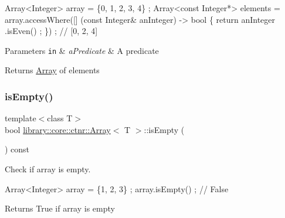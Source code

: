 \begin{DoxyCode}
Array<Integer> array = \{0, 1, 2, 3, 4\} ;
Array<const Integer*> elements = array.accessWhere([] (\textcolor{keyword}{const} Integer& anInteger) -> \textcolor{keywordtype}{bool} \{ \textcolor{keywordflow}{return} anInteger
      .isEven() ; \}) ; \textcolor{comment}{// [0, 2, 4]}
\end{DoxyCode}



\begin{DoxyParams}[1]{Parameters}
\mbox{\tt in}  & {\em a\+Predicate} & A predicate \\
\hline
\end{DoxyParams}
\begin{DoxyReturn}{Returns}
\hyperlink{classlibrary_1_1core_1_1ctnr_1_1_array}{Array} of elements 
\end{DoxyReturn}
\mbox{\label{classlibrary_1_1core_1_1ctnr_1_1_array_a77d943be46a6d0313be3f2c5ca66d231}} 
\subsubsection{\texorpdfstring{is\+Empty()}{isEmpty()}}
{\footnotesize\ttfamily template$<$class T$>$ \\
bool \hyperlink{classlibrary_1_1core_1_1ctnr_1_1_array}{library\+::core\+::ctnr\+::\+Array}$<$ T $>$\+::is\+Empty (\begin{DoxyParamCaption}{ }\end{DoxyParamCaption}) const}



Check if array is empty. 


\begin{DoxyCode}
Array<Integer> array = \{1, 2, 3\} ;
array.isEmpty() ; \textcolor{comment}{// False}
\end{DoxyCode}


\begin{DoxyReturn}{Returns}
True if array is empty 
\end{DoxyReturn}
\mbox{\label{classlibrary_1_1core_1_1ctnr_1_1_array_abe72cec38e65761df3eaddcfa9b7a44a}} 
